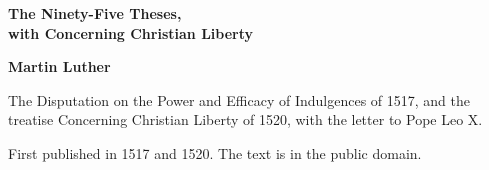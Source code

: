 \documentclass[11pt,letterpaper]{article}
\begin{document}
\color{ink}

\begin{titlepage}
\centering
\vspace*{4em}
{\LARGE\bfseries\color{heading} The Ninety-Five Theses,\\[0.3em]with Concerning Christian Liberty\par}
\vspace{2em}
{\Large\bfseries\color{heading} Martin Luther\par}
\vspace{2.5em}
{\itshape\color{subhead}\parbox{0.8\linewidth}{\centering The Disputation on the Power and Efficacy of Indulgences of 1517, and the treatise Concerning Christian Liberty of 1520, with the letter to Pope Leo X.\par}}
\vfill
{\small First published in 1517 and 1520. The text is in the public domain.\par}
\vspace{2em}
\end{titlepage}

\tableofcontents


\end{document}
